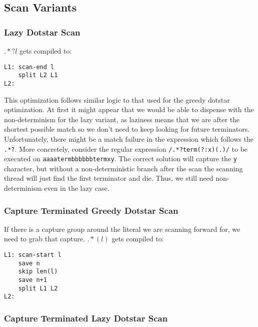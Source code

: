 
\subsection{Scan Variants}

\subsubsection{Lazy Dotstar Scan} %

$.*?l$ gets compiled to:

\begin{verbatim}
L1: scan-end l
    split L2 L1
L2: 
\end{verbatim}

This optimization follows similar logic to that used for the greedy
dotstar optimization. At first it might appear that we would be able
to dispense with the non-determinism for the lazy variant, as laziness
means that we are after the shortest possible match so we don't
need to keep looking for future terminators. Unfortunately, there
might be a match failure in the expression which follows the
\verb'.*?'. More concretely, consider the regular expression
\verb'/.*?term(?:x)(.)/'
to be executed on \verb'aaaatermbbbbbbtermxy'. The correct solution will
capture the \verb'y' character, but without a non-deterministic branch
after the scan the scanning thread will just find the first terminator and
die. Thus, we still need non-determinism even in the lazy case.

\subsubsection{Capture Terminated Greedy Dotstar Scan}
  \label{capterm}

If there is a capture group around the literal we are scanning forward
for, we need to grab that capture. $.*(l)$ gets compiled to:

\begin{verbatim}
L1: scan-start l
    save n
    skip len(l)
    save n+1
    split L1 L2
L2: 
\end{verbatim}

\subsubsection{Capture Terminated Lazy Dotstar Scan}

